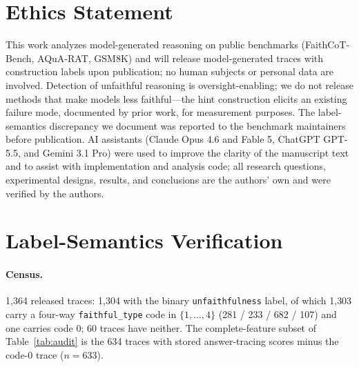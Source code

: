 \documentclass[11pt]{article}
\begin{document}
\section*{Ethics Statement}
This work analyzes model-generated reasoning on public benchmarks (FaithCoT-Bench, AQuA-RAT, GSM8K) and will release model-generated traces with construction labels upon publication; no human subjects or personal data are involved. Detection of unfaithful reasoning is oversight-enabling; we do not release methods that make models less faithful---the hint construction elicits an existing failure mode, documented by prior work, for measurement purposes. The label-semantics discrepancy we document was reported to the benchmark maintainers before publication. AI assistants (Claude Opus 4.6 and Fable 5, ChatGPT GPT-5.5, and Gemini 3.1 Pro) were used to improve the clarity of the manuscript text and to assist with implementation and analysis code; all research questions, experimental designs, results, and conclusions are the authors' own and were verified by the authors.




\appendix

\section{Label-Semantics Verification}
\label{app:labels}

\paragraph{Census.} 1{,}364 released traces: 1{,}304 with the binary \texttt{unfaithfulness} label, of which 1{,}303 carry a four-way \texttt{faithful\_type} code in $\{1,\dots,4\}$ (281 / 233 / 682 / 107) and one carries code 0; 60 traces have neither. The complete-feature subset of Table~\ref{tab:audit} is the 634 traces with stored answer-tracing scores minus the code-0 trace ($n{=}633$).
\end{document}
